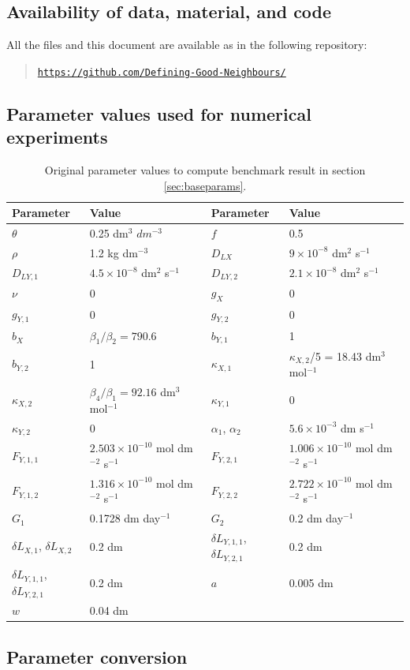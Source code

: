 \documentclass[11pt]{article}
\numberwithin{equation}{section}
\begin{document}
\subsection{Availability of data, material, and code}
\label{app:one}
All the files and this document are available as in the following repository:
\begin{quote}
    \noindent \href{https://github.com/Defining-Good-Neighbours/}{\texttt{https://github.com/Defining-Good-Neighbours/}}
\end{quote}

\subsection{Parameter values used for numerical experiments}
\begin{table}[h]
\begin{center}

\fontsize{9.5}{7}\selectfont
\setlength{\tabcolsep}{5.pt}
\def\arraystretch{2.0}
\begin{tabular}{ll|ll}
\toprule
  \textbf{Parameter} & \textbf{Value} & \textbf{Parameter} & \textbf{Value}  \\
 \hline 
$\theta$ & 0.25 dm$^3$ $dm^{-3}$ & $f$ & 0.5 \\
$\rho$ & 1.2 kg dm$^{-3}$ & $D_{LX}$ & $9 \times 10^{-8}$ dm$^2$ s$^{-1}$\\
$D_{LY,1}$  & $4.5 \times 10^{-8}$ dm$^2$ s$^{-1}$ & $D_{LY,2}$ & $2.1 \times 10^{-8}$ dm$^2$ s$^{-1}$ \\
$\nu$ & 0 & $g_X$ & 0 \\
$g_{Y,1}$ & 0 & $g_{Y,2}$ & 0 \\
$b_X$ & $\beta_1 / \beta_2 = 790.6$ & $b_{Y,1}$ & 1 \\
$b_{Y,2}$ & 1 & $\kappa_{X,1}$ & $\kappa_{X,2}$/5 = 18.43 dm$^3$ mol$^{-1}$ \\
$\kappa_{X,2}$ & $\beta_4 / \beta_1 = 92.16$ dm$^3$ mol$^{-1}$ & $\kappa_{Y,1}$ & 0 \\
$\kappa_{Y,2}$ & 0 & $\alpha_1$, $\alpha_2$ & $5.6 \times 10^{-3}$ dm s$^{-1}$\\
$F_{Y,1,1}$ & $2.503 \times 10^{-10}$ mol dm$^{-2}$ s$^{-1}$ & $F_{Y,2,1}$ & $1.006 \times 10^{-10}$  mol dm$^{-2}$ s$^{-1}$ \\
$F_{Y,1,2}$ & $1.316 \times 10^{-10}$ mol dm$^{-2}$ s$^{-1}$ & $F_{Y,2,2}$ & $2.722 \times 10^{-10}$  mol dm$^{-2}$ s$^{-1}$\\
$G_1$ & 0.1728 dm day$^{-1}$ & $G_2$ & 0.2 dm day$^{-1}$ \\
$\delta L_{X,1}$, $\delta L_{X,2}$ & 0.2 dm & $\delta L_{Y,1,1}$, $\delta L_{Y,2,1}$ & 0.2 dm \\
$\delta L_{Y,1,1}$, $\delta L_{Y,2,1}$ & 0.2 dm & $a$ & 0.005 dm \\
$w$ & 0.04 dm & & \\
\bottomrule
\end{tabular}
\caption{Original parameter values to compute benchmark result in section \ref{sec:baseparams}. \label{t:baseparams}}

\end{center}
\end{table}


\subsection{Parameter conversion}
\label{app:two}
\end{document}
